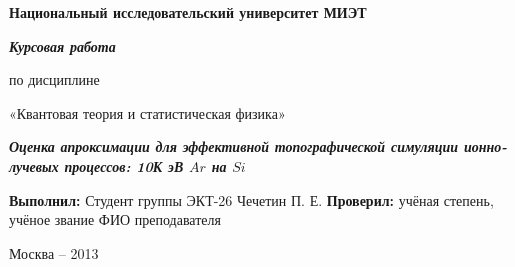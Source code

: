 \documentclass[a4paper,fontsize=12pt]{article}
\begin{document}

%

\begin{titlepage}
  \thispagestyle{empty}

  \begin{center}
    \Large{\textbf{Национальный исследовательский университет МИЭТ}}

    \vspace{5cm}

    \huge{\textbf{\textit{Курсовая работа}}}

    \large{по дисциплине}

    \large{«Квантовая теория и статистическая физика»}

    \vspace{1cm}

    \huge{\textbf{\textit{Оценка апроксимации для эффективной топографической симуляции ионно-лучевых процессов: 10К эВ $Ar$ на $Si$}}}
  \end{center}

  \vspace{1cm}

  \begin{flushright}
    \textbf{Выполнил:}                  \linebreak
    Студент группы ЭКТ-26               \linebreak
    Чечетин П. Е.                       \linebreak
    \textbf{Проверил:}                  \linebreak
    учёная степень, учёное звание       \linebreak
    ФИО преподавателя                   \linebreak
  \end{flushright}

  \vfill

  \begin{center}
    \Large{Москва – 2013}
  \end{center}
\end{titlepage}

\newpage
\tableofcontents

\newpage
\end{document}
